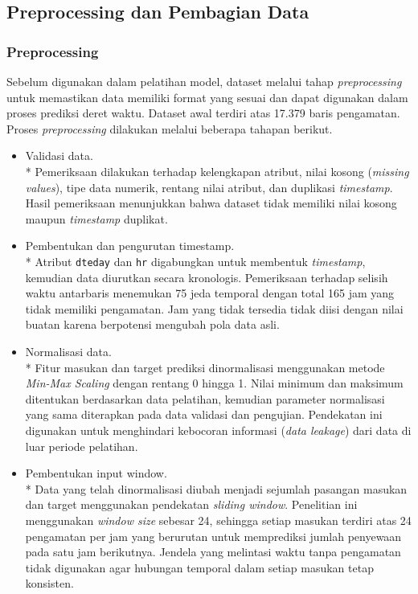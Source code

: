 \documentclass[10pt,conference]{IEEEtran}
\begin{document}
\subsection{Preprocessing dan Pembagian Data}

\subsubsection{Preprocessing}

Sebelum digunakan dalam pelatihan model, dataset melalui tahap \textit{preprocessing} untuk memastikan data memiliki format yang sesuai dan dapat digunakan dalam proses prediksi deret waktu. Dataset awal terdiri atas 17.379 baris pengamatan. Proses \textit{preprocessing} dilakukan melalui beberapa tahapan berikut.

\begin{itemize}
\item Validasi data.\\*
Pemeriksaan dilakukan terhadap kelengkapan atribut, nilai kosong (\textit{missing values}), tipe data numerik, rentang nilai atribut, dan duplikasi \textit{timestamp}. Hasil pemeriksaan menunjukkan bahwa dataset tidak memiliki nilai kosong maupun \textit{timestamp} duplikat.

\item Pembentukan dan pengurutan timestamp.\\*
Atribut \texttt{dteday} dan \texttt{hr} digabungkan untuk membentuk \textit{timestamp}, kemudian data diurutkan secara kronologis. Pemeriksaan terhadap selisih waktu antarbaris menemukan 75 jeda temporal dengan total 165 jam yang tidak memiliki pengamatan. Jam yang tidak tersedia tidak diisi dengan nilai buatan karena berpotensi mengubah pola data asli.

\item Normalisasi data.\\*
Fitur masukan dan target prediksi dinormalisasi menggunakan metode \textit{Min-Max Scaling} dengan rentang 0 hingga 1. Nilai minimum dan maksimum ditentukan berdasarkan data pelatihan, kemudian parameter normalisasi yang sama diterapkan pada data validasi dan pengujian. Pendekatan ini digunakan untuk menghindari kebocoran informasi (\textit{data leakage}) dari data di luar periode pelatihan.

\item Pembentukan input window.\\*
Data yang telah dinormalisasi diubah menjadi sejumlah pasangan masukan dan target menggunakan pendekatan \textit{sliding window}. Penelitian ini menggunakan \textit{window size} sebesar 24, sehingga setiap masukan terdiri atas 24 pengamatan per jam yang berurutan untuk memprediksi jumlah penyewaan pada satu jam berikutnya. Jendela yang melintasi waktu tanpa pengamatan tidak digunakan agar hubungan temporal dalam setiap masukan tetap konsisten.

\end{itemize}
\end{document}
